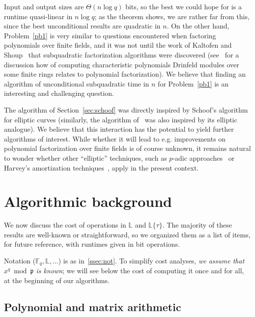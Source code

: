 \documentclass[sigconf]{acmart}
\newcommand{\F}{\mathbb{F}}
\renewcommand{\L}{\mathbb{L}}
\newcommand{\ang}[1]{\{#1\}}
\newcommand{\frakp}{\mathfrak{p}}
\begin{document}
Input and output sizes are $\Theta(n \log q)$ bits, so the best we
could hope for is a runtime quasi-linear in $n \log q$; as the theorem
shows, we are rather far from this, since the best unconditional
results are quadratic in $n$. On the other hand, Problem~\ref{pb1} is
very similar to questions encountered when factoring polynomials over
finite fields, and it was not until the work of Kaltofen and
Shoup~\cite{KaSh98} that subquadratic factorization algorithms were
discovered (see~\cite{Narayanan18} for a discussion how of computing
characteristic polynomials Drinfeld modules over some finite rings
relates to polynomial factorization).  We believe that
finding an algorithm of unconditional subquadratic time in $n$ for
Problem~\ref{pb1} is an interesting and challenging question.

The algorithm of Section~\ref{sec:schoof} was directly inspired by
Schoof's algorithm for elliptic curves (similarly, the algorithm
of~\cite{eschost2017arXiv171200669D} was also inspired by its
elliptic analogue). We believe that this interaction has the potential to
yield further algorithms of interest. While whether it will lead to
e.g. improvements on polynomial factorization over finite fields is of
course unknown, it remains natural to wonder whether other
``elliptic'' techniques, such as $p$-adic approaches~\cite{Satoh00} or
Harvey's amortization techniques~\cite{Harvey14}, apply in the present
context.


\section{Algorithmic background}

We now discuss the cost of operations in $\L$ and $\L\ang{\tau}$. The
majority of these results are well-known or straightforward, so we
organized them as a list of items, for future reference, with runtimes
given in bit operations.

Notation ($\F_q,\L,\dots$) is as in~\ref{ssec:not}. To simplify cost
analyses, {\em we assume that $x^q \bmod \frakp$ is known}; we will
see below the cost of computing it once and for all, at the beginning
of our algorithms.



\subsection{Polynomial and matrix arithmetic}\label{ssec:basicpoly}
\end{document}

